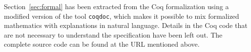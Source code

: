 \documentclass[10pt,a4paper]{article}
\begin{document}
Section~\ref{sec:formal} has been extracted from the Coq formalization using a modified version of the tool \texttt{coqdoc}, which makes it possible to mix formalized mathematics with explanations in natural language. Details in the Coq code that are not necessary to understand the specification have been left out. The complete source code can be found at the URL mentioned above.

\nonstopmode

\end{document}
